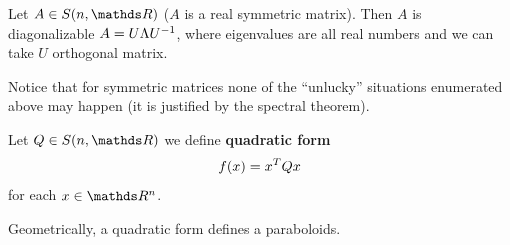 \documentclass[computationalMathematics.tex]{subfiles}
\begin{document}
\begin{theorem}
  Let $A \in S(n, \R)$ ($A$ is a real symmetric matrix). Then $A$ is diagonalizable $A = U\Lambda {U}^{-1}$, where eigenvalues are all real numbers and we can take $U$ orthogonal matrix.
\end{theorem}


Notice that for symmetric matrices none of the ``unlucky'' situations enumerated above may happen (it is justified by the spectral theorem).


\begin{definition}
  Let $Q \in S(n, \R)$ we define \textbf{quadratic form}
  \[
    f(x) = {x}^{T} Q x
  \]
  for each $x \in \R^{n}$.
\end{definition}

Geometrically, a quadratic form defines a paraboloids.
\end{document}
